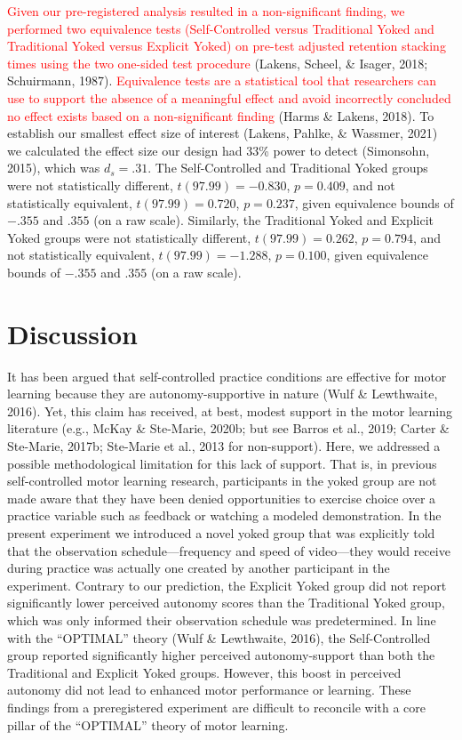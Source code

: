 \documentclass[
  english,
  man, donotrepeattitle,floatsintext]{apa7}
\begin{document}
\textcolor{red}{Given our pre-registered analysis resulted in a non-significant finding, we performed two equivalence tests (Self-Controlled versus Traditional Yoked and Traditional Yoked versus Explicit Yoked) on pre-test adjusted retention stacking times using the two one-sided test procedure} (Lakens, Scheel, \& Isager, 2018; Schuirmann, 1987). \textcolor{red}{Equivalence tests are a statistical tool that researchers can use to support the absence of a meaningful effect and avoid incorrectly concluded no effect exists based on a non-significant finding} (Harms \& Lakens, 2018). To establish our smallest effect size of interest (Lakens, Pahlke, \& Wassmer, 2021) we calculated the effect size our design had 33\% power to detect (Simonsohn, 2015), which was \(d_{s} = .31\). The Self-Controlled and Traditional Yoked groups were not statistically different, \(t(97.99) = -0.830\), \(p = 0.409\), and not statistically equivalent, \(t(97.99) = 0.720\), \(p = 0.237\), given equivalence bounds of \(-.355\) and \(.355\) (on a raw scale). Similarly, the Traditional Yoked and Explicit Yoked groups were not statistically different, \(t(97.99) = 0.262\), \(p = 0.794\), and not statistically equivalent, \(t(97.99) = -1.288\), \(p = 0.100\), given equivalence bounds of \(-.355\) and \(.355\) (on a raw scale).

\hypertarget{discussion}{%
\section{Discussion}\label{discussion}}

It has been argued that self-controlled practice conditions are effective for motor learning because they are autonomy-supportive in nature (Wulf \& Lewthwaite, 2016). Yet, this claim has received, at best, modest support in the motor learning literature (e.g., McKay \& Ste-Marie, 2020b; but see Barros et al., 2019; Carter \& Ste-Marie, 2017b; Ste-Marie et al., 2013 for non-support). Here, we addressed a possible methodological limitation for this lack of support. That is, in previous self-controlled motor learning research, participants in the yoked group are not made aware that they have been denied opportunities to exercise choice over a practice variable such as feedback or watching a modeled demonstration. In the present experiment we introduced a novel yoked group that was explicitly told that the observation schedule---frequency and speed of video---they would receive during practice was actually one created by another participant in the experiment. Contrary to our prediction, the Explicit Yoked group did not report significantly lower perceived autonomy scores than the Traditional Yoked group, which was only informed their observation schedule was predetermined. In line with the ``OPTIMAL'' theory (Wulf \& Lewthwaite, 2016), the Self-Controlled group reported significantly higher perceived autonomy-support than both the Traditional and Explicit Yoked groups. However, this boost in perceived autonomy did not lead to enhanced motor performance or learning. These findings from a preregistered experiment are difficult to reconcile with a core pillar of the ``OPTIMAL'' theory of motor learning.
\end{document}
